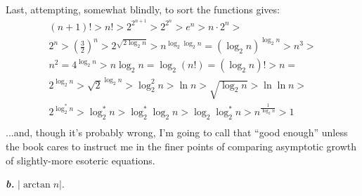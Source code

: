 \documentclass{article}
\begin{document}
Last, attempting, somewhat blindly, to sort the functions gives:
\begin{multline}
	(n+1)! > n! > 2^{2^{n+1}} > 2^{2^n} > e^n > n \cdot 2^n > \\
	2^n > \left(\frac{3}{2}\right)^n > 2^{\sqrt{2 \log_2 n}} > n^{\log_2 \log_2 n} = \left(\log_2 n\right)^{\log_2 n} > n^3 > \\
	n^2 = 4^{\log_2 n} > n \log_2 n = \log_2 (n!) = \left(\log_2 n\right)! > n = \\
	2^{\log_2 n} > \sqrt{2}^{\log_2 n} > \log^2_2 n > \ln n > \sqrt{\log_2 n} > \ln \ln n > \\
	2^{\log^*_2 n} > \log^*_2 n > \log^*_2 \log_2 n > \log_2 \log^*_2 n > n^{\frac{1}{\log_2 n}} > 1 \\
\end{multline}
...and, though it's probably wrong, I'm going to call that ``good enough'' unless the book cares to instruct me in the finer points of comparing asymptotic growth of slightly-more esoteric equations.

\noindent\textbf{\textit{b.}} $| \arctan n |$.
\end{document}
